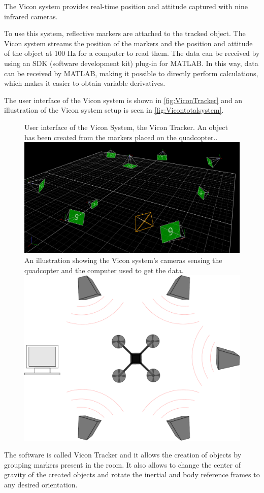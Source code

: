 The Vicon system provides real-time position and attitude captured with nine infrared cameras.
%

To use this system, reflective markers are attached to the tracked object. The Vicon system streams the position of the markers and the position and attitude of the object at 100 Hz for a computer to read them\cite{ViconDataSTream}. The data can be received by using an SDK (software development kit) plug-in for MATLAB. In this way, data can be received by MATLAB, making it possible to directly perform calculations, which makes it easier to obtain variable derivatives.

The user interface of the Vicon system is shown in \autoref{fig:ViconTracker} and an illustration of the Vicon system setup is seen in \autoref{fig:Vicontotalsystem}. 
%
\begin{figure}[H]
	\centering
	\captionbox
	{
		User interface of the Vicon System, the Vicon Tracker. An object has been created from the markers placed on the quadcopter..
		\label{fig:ViconTracker}
	}
	{
	\includegraphics[width=.5\textwidth]{figures/ViconTracker3}
	}
  \hspace{5pt}
  \captionbox
  {
  	An illustration showing the Vicon system's cameras sensing the quadcopter and the computer used to get the data.
  	\label{fig:Vicontotalsystem}
  }
  {
  	\includegraphics[width=.40\textwidth]{figures/system.pdf}
  }
\end{figure}
The software is called Vicon Tracker and it allows the creation of objects by grouping markers present in the room. It also allows to change the center of gravity of the created objects and rotate the inertial and body reference frames to any desired orientation.

